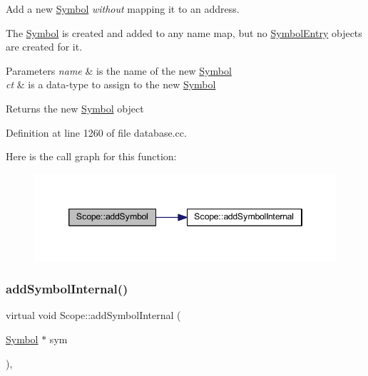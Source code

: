 Add a new \mbox{\hyperlink{class_symbol}{Symbol}} {\itshape without} mapping it to an address. 

The \mbox{\hyperlink{class_symbol}{Symbol}} is created and added to any name map, but no \mbox{\hyperlink{class_symbol_entry}{Symbol\+Entry}} objects are created for it. 
\begin{DoxyParams}{Parameters}
{\em name} & is the name of the new \mbox{\hyperlink{class_symbol}{Symbol}} \\
\hline
{\em ct} & is a data-\/type to assign to the new \mbox{\hyperlink{class_symbol}{Symbol}} \\
\hline
\end{DoxyParams}
\begin{DoxyReturn}{Returns}
the new \mbox{\hyperlink{class_symbol}{Symbol}} object 
\end{DoxyReturn}


Definition at line 1260 of file database.\+cc.

Here is the call graph for this function\+:
\nopagebreak
\begin{figure}[H]
\begin{center}
\leavevmode
\includegraphics[width=346pt]{class_scope_a96e7adcd07f0dbd9cf1777e2b3be9fe2_cgraph}
\end{center}
\end{figure}
\mbox{\label{class_scope_a66d3198f4bd28cf9e8a2a6bc00d065d8}} 
\subsubsection{\texorpdfstring{addSymbolInternal()}{addSymbolInternal()}}
{\footnotesize\ttfamily virtual void Scope\+::add\+Symbol\+Internal (\begin{DoxyParamCaption}\item[{\mbox{\hyperlink{class_symbol}{Symbol}} $\ast$}]{sym }\end{DoxyParamCaption})\hspace{0.3cm}{\ttfamily [protected]}, {}}



